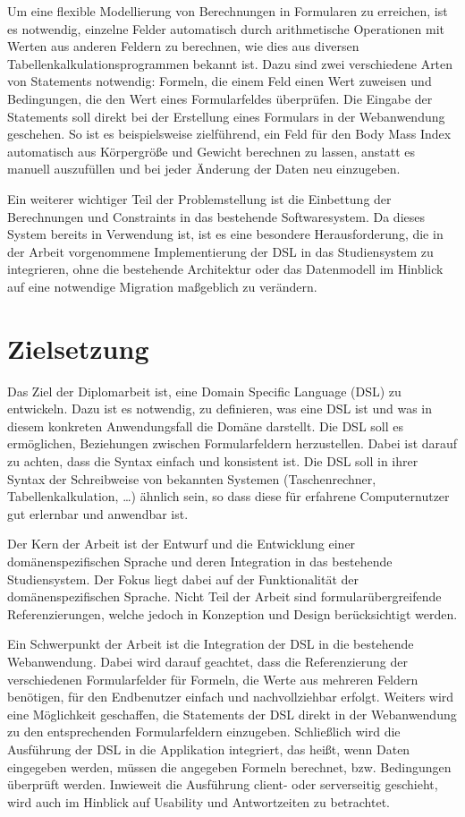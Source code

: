 Um eine flexible Modellierung von Berechnungen in Formularen zu erreichen, ist es notwendig, einzelne Felder
automatisch durch arithmetische Operationen mit Werten aus anderen Feldern zu berechnen, wie dies aus diversen
Tabellenkalkulationsprogrammen bekannt ist. Dazu sind zwei verschiedene Arten von Statements notwendig:
Formeln, die einem Feld einen Wert zuweisen und Bedingungen, die den Wert eines Formularfeldes
über\-prü\-fen. Die Eingabe der Statements soll direkt bei der Erstellung eines Formulars in der Webanwendung
geschehen. So ist es beispielsweise zielführend, ein Feld für den Body Mass Index automatisch aus
Körpergröße und Gewicht berechnen zu lassen, anstatt es manuell auszufüllen und bei jeder Änderung der
Daten neu einzugeben.

Ein weiterer wichtiger Teil der Problemstellung ist die Einbettung der Berechnungen und Constraints in das
bestehende Softwaresystem. Da dieses System bereits in Verwendung ist, ist es eine besondere
Herausforderung, die in der Arbeit vorgenommene Implementierung der DSL in das Studiensystem zu integrieren,
ohne die bestehende Architektur oder das Datenmodell im Hinblick auf eine notwendige Migration
maßgeblich zu verändern.


\section{Zielsetzung}

Das Ziel der Diplomarbeit ist, eine Domain Specific Language (DSL) zu entwickeln. Dazu ist es notwendig, zu definieren, was eine DSL
ist und was in diesem konkreten Anwendungsfall die Domäne darstellt. Die DSL soll es ermöglichen,
Beziehungen zwischen Formularfeldern herzustellen. Dabei ist darauf zu achten, dass die Syntax einfach
und konsistent ist. Die DSL soll in ihrer Syntax der Schreibweise von bekannten Systemen (Taschenrechner,
Tabellenkalkulation, …) ähnlich sein, so dass diese für erfahrene Computernutzer gut erlernbar und
anwendbar ist.

Der Kern der Arbeit ist der Entwurf und die Entwicklung einer do\-mä\-nen\-spe\-zi\-fi\-schen Sprache und deren
Integration in das bestehende Studiensystem. Der Fokus liegt dabei auf der Funktionalität der
domänenspezifischen Sprache. Nicht Teil der Arbeit sind formularübergreifende Referenzierungen, welche
jedoch in Konzeption und Design berücksichtigt werden. 

Ein Schwerpunkt der Arbeit ist die Integration der DSL in die bestehende Webanwendung. Dabei wird darauf
geachtet, dass die Referenzierung der verschiedenen Formularfelder für Formeln, die Werte aus
mehreren Feldern benötigen, für den Endbenutzer einfach und nachvollziehbar erfolgt. Weiters wird eine
Möglichkeit geschaffen, die Statements der DSL direkt in der Webanwendung zu den
entsprechenden Formularfeldern einzugeben. Schließlich wird die Ausführung der DSL in die Applikation
integriert, das heißt, wenn Daten eingegeben werden, müssen die angegeben Formeln berechnet, bzw.
Bedingungen überprüft werden. Inwieweit die Ausführung client- oder serverseitig geschieht, wird auch im
Hinblick auf Usability und Antwortzeiten zu betrachtet.




